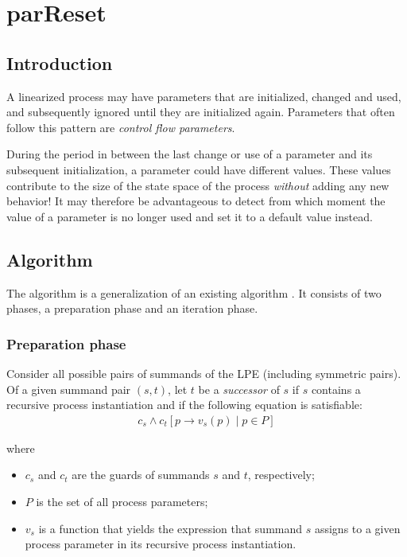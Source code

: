 \chapter{parReset}

\section{Introduction}

A linearized process may have parameters that are initialized, changed and used, and subsequently ignored until they are initialized again.
Parameters that often follow this pattern are \emph{control flow parameters}.

During the period in between the last change or use of a parameter and its subsequent initialization, a parameter could have different values.
These values contribute to the size of the state space of the process \emph{without} adding any new behavior!
It may therefore be advantageous to detect from which moment the value of a parameter is no longer used and set it to a default value instead.

\section{Algorithm}

The algorithm is a generalization of an existing algorithm \cite{van2009state}.
It consists of two phases, a preparation phase and an iteration phase.

\subsection{Preparation phase}

Consider all possible pairs of summands of the LPE (including symmetric pairs).
Of a given summand pair $(s, t)$, let $t$ be a \emph{successor} of $s$ if $s$ contains a recursive process instantiation and if the following equation is satisfiable:
\begin{align*}
c_s \land {c_t}[p \rightarrow v_s(p) \;|\; p \in P]
\end{align*}

where

\begin{itemize}
\item $c_s$ and $c_t$ are the guards of summands $s$ and $t$, respectively;
\item $P$ is the set of all process parameters;
\item $v_s$ is a function that yields the expression that summand $s$ assigns to a given process parameter in its recursive process instantiation.
\end{itemize}

